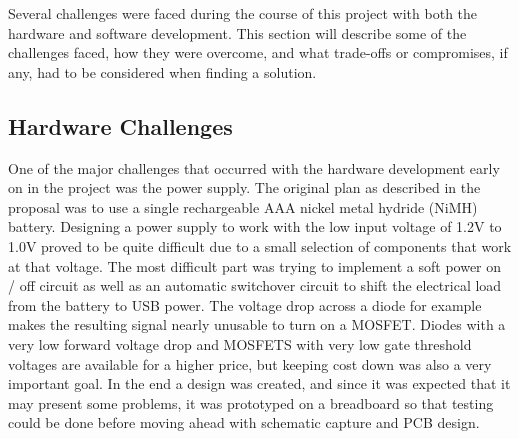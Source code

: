 Several challenges were faced during the course of this project with both the
hardware and software development. This section will describe some of the 
challenges faced, how they were overcome, and what trade-offs or compromises,
if any, had to be considered when finding a solution.

\subsection{Hardware Challenges}

One of the major challenges that occurred with the hardware development early
on in the project was the power supply. The original plan as described in the 
proposal was to use a single rechargeable AAA nickel metal hydride (NiMH) 
battery. Designing a power supply to work with the low input voltage of 1.2V 
to 1.0V proved to be quite difficult due to a small selection of components that 
work at that voltage. The most difficult part was trying to implement a soft 
power on / off circuit as well as an automatic switchover circuit to shift the 
electrical load from the battery to USB power. The voltage drop across a diode 
for example makes the resulting signal nearly unusable to turn on a MOSFET. 
Diodes with a very low forward voltage drop and MOSFETS with very low gate 
threshold voltages are available for a higher price, but keeping cost down was 
also a very important goal. In the end a design was created, and since it was 
expected that it may present some problems, it was prototyped on a breadboard 
so that testing could be done before moving ahead with schematic capture and 
PCB design.


